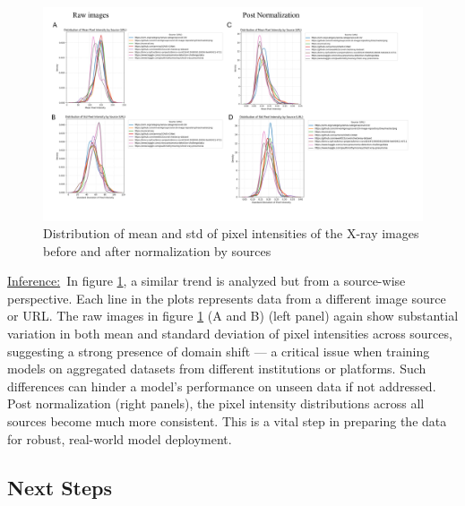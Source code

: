 \documentclass{article}
\begin{document}
\vspace{0.3cm}
\newpage
\begin{figure}[h!] %
    \centering
    \includegraphics[width=1.0\linewidth]{Screenshot 2025-04-21 223207.png}
    \caption{Distribution of mean and std of pixel intensities of the X-ray images before and after normalization by sources}
    \label{fig:KDE_pre_post_normalization_URL}
\end{figure}

\vspace{0.3cm}

\underline{Inference:}\
In figure \ref{fig:KDE_pre_post_normalization_URL}, a similar trend is analyzed but from a source-wise perspective. Each line in the plots represents data from a different image source or URL. The raw images in figure \ref{fig:KDE_pre_post_normalization_URL} (A and B) (left panel) again show substantial variation in both mean and standard deviation of pixel intensities across sources, suggesting a strong presence of domain shift — a critical issue when training models on aggregated datasets from different institutions or platforms. Such differences can hinder a model’s performance on unseen data if not addressed. Post normalization (right panels), the pixel intensity distributions across all sources become much more consistent. This is a vital step in preparing the data for robust, real-world model deployment.

\vspace{0.3cm}

\newpage
\newpage

\subsection{Next Steps}\
\end{document}
